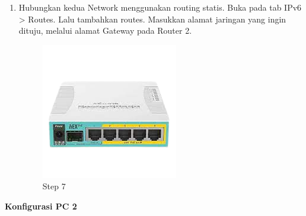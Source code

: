 \begin{enumerate}
	\item Hubungkan kedua Network menggunakan routing statis. Buka pada tab IPv6 > Routes. Lalu
	tambahkan routes. Masukkan alamat jaringan yang ingin dituju, melalui alamat Gateway pada
	Router 2.
	
	\begin{figure}[H]
		\centering
		\includegraphics[width=0.7\linewidth]{P1/img/contoh.png}
		\caption{Step 7}
		\label{fig:gambar1}
	\end{figure}

\end{enumerate}

\begin{center} 
	\textbf{Konfigurasi PC 2}
\end{center}

